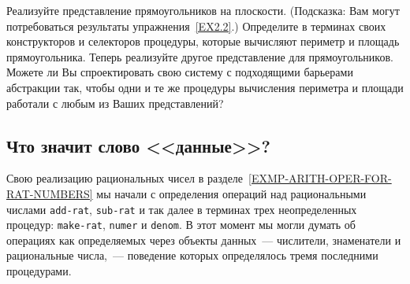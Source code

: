 \begin{exercise}{2.3}\label{EX2.3}%
%
%
Реализуйте представление прямоугольников на
плоскости. (Подсказка: Вам могут потребоваться результаты 
упражнения~\ref{EX2.2}.)  Определите в терминах своих конструкторов и
селекторов процедуры, которые вычисляют периметр и площадь
прямоугольника.  Теперь реализуйте другое представление для
прямоугольников.  Можете ли Вы спроектировать свою систему с
подходящими барьерами абстракции так, чтобы одни и те же процедуры
вычисления периметра и площади работали с любым из Ваших представлений?
\end{exercise}

\subsection{Что значит слово <<данные>>?}
\label{WHAT-IS-MEANT-BY-DATA}

%
Свою реализацию рациональных чисел в разделе~\ref{EXMP-ARITH-OPER-FOR-RAT-NUMBERS}
мы начали с определения операций над рациональными числами {\tt add-rat},
{\tt sub-rat} и так далее в терминах трех неопределенных
процедур: {\tt make-rat}, {\tt numer} и
{\tt denom}.  В этот момент мы могли думать об операциях как
определяемых через объекты данных~--- числители, знаменатели и
рациональные числа,~--- поведение которых определялось тремя
последними про\-цедурами.

